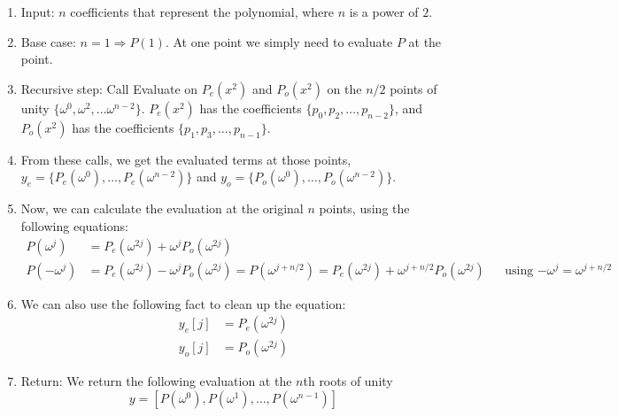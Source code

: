 \begin{enumerate}
  \item Input: $n$ coefficients that represent the polynomial, where $n$ is a power of $2$.
  \item Base case: $n = 1 \Rightarrow P(1)$. At one point we simply need to evaluate $P$ at the point.
  \item Recursive step: Call Evaluate on $P_e(x^2)$ and $P_o(x^2)$ on the $n/2$ points of unity $\{\omega^0, \omega^2, \dots \omega^{n-2}\}$. $P_e(x^2)$ has the coefficients $\{p_0, p_2, \dots, p_{n-2}\}$, and $P_o(x^2)$ has the coefficients $\{p_1, p_3, \dots, p_{n-1}\}$.
  \item From these calls, we get the evaluated terms at those points, $y_e = \{P_e(\omega^0), \dots, P_e(\omega^{n-2})\}$ and $y_o = \{P_o(\omega^0), \dots, P_o(\omega^{n-2})\}$.
  \item Now, we can calculate the evaluation at the original $n$ points, using the following equations:
    \begin{align}
      P(\omega^j) &= P_e(\omega^{2j}) + \omega^j P_o(\omega^{2j}) \\
      P(-\omega^{j}) &= P_e(\omega^{2j}) - \omega^j P_o(\omega^{2j}) = P(\omega^{j + n/2}) = P_e(\omega^{2j}) + \omega^{j + n/2} P_o(\omega^{2j}) && \text{using $-\omega^j = \omega^{j + n/2}$}
    \end{align}
  \item We can also use the following fact to clean up the equation:
    \begin{align}
      y_e[j] &= P_e(\omega^{2j}) \\
      y_o[j] &= P_o(\omega^{2j})
    \end{align}
  \item Return: We return the following evaluation at the $n$th roots of unity
    \[y = [P(\omega^0), P(\omega^1), \dots, P(\omega^{n-1})]\]
\end{enumerate}

